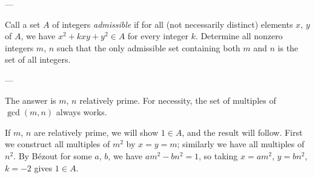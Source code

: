 
---

Call a set $A$ of integers \emph{admissible} if for all (not necessarily distinct) elements $x$, $y$ of $A$, we have $x^2+kxy+y^2\in A$ for every integer $k$.
Determine all nonzero integers $m$, $n$ such that the only admissible set containing both $m$ and $n$ is the set of all integers.

---

The answer is $m$, $n$ relatively prime. For necessity, the set of multiples of $\gcd(m,n)$ always works.

If $m$, $n$ are relatively prime, we will show $1\in A$, and the result will follow. First we construct all multiples of $m^2$ by $x=y=m$; similarly we have all multiples of $n^2$. By B\'ezout for some $a$, $b$, we have $am^2-bn^2=1$, so taking $x=am^2$, $y=bn^2$, $k=-2$ gives $1\in A$.

